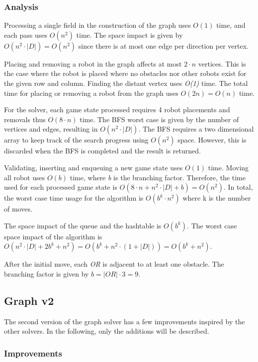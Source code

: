 \documentclass[]{article}
\begin{document}
\subsubsection{Analysis}\label{analysis-1}

Processing a single field in the construction of the graph uses \(O(1)\)
time, and each pass uses \(O(n^2)\) time. The space impact is given by
\(O(n^2 \cdot |D|) = O(n^2)\) since there is at most one edge per
direction per vertex.

Placing and removing a robot in the graph affects at most \(2 \cdot n\)
vertices. This is the case where the robot is placed where no obstacles
nor other robots exist for the given row and column. Finding the distant
vertex uses \emph{O(1)} time. The total time for placing or removing a
robot from the graph uses \(O(2n) = O(n)\) time.

For the solver, each game state processed requires 4 robot placements
and removals thus \(O(8 \cdot n)\) time. The BFS worst case is given by
the number of vertices and edges, resulting in \(O(n^2 \cdot |D|)\). The
BFS requires a two dimensional array to keep track of the search
progress using \(O(n^2)\) space. However, this is discarded when the BFS
is completed and the result is returned.

Validating, inserting and enqueuing a new game state uses \(O(1)\) time.
Moving all robot uses \(O(b)\) time, where \emph{b} is the branching
factor. Therefore, the time used for each processed game state is
\(O(8 \cdot n + n^2 \cdot |D| + b) = O(n^2)\). In total, the worst case
time usage for the algorithm is \(O(b^k \cdot n^2)\) where k is the
number of moves.

The space impact of the queue and the hashtable is \(O(b^k)\). The worst
case space impact of the algorithm is
\(O(n^2 \cdot |D| + 2b^k + n^2) = O(b^k + n^2 \cdot (1 + |D|)) = O(b^k + n^2)\).

After the initial move, each \emph{OR} is adjacent to at least one
obstacle. The branching factor is given by \(b = |OR| \cdot 3 = 9\).

\subsection{Graph v2}\label{graph-v2}

The second version of the graph solver has a few improvements inspired
by the other solvers. In the following, only the additions will be
described.

\subsubsection{Improvements}\label{improvements}
\end{document}
